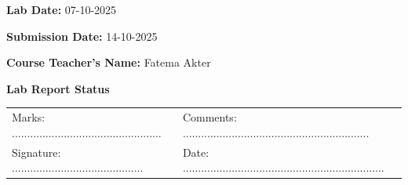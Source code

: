 \documentclass[10pt, a4paper]{scrartcl}
\begin{document}
\begin{titlepage}
\begin{minipage}{0.5\textwidth}
    \end{minipage}
        \vspace{1.5cm}

    
    \begin{flushleft}
        \large
        \textbf{Lab Date:} 07-10-2025\par
        \vspace{0.3cm}
        \textbf{Submission Date:} 14-10-2025\par
        \vspace{0.3cm}
        \textbf{Course Teacher's Name:} Fatema Akter\par
    \end{flushleft}
    
    \vspace{1cm}
    
    \begin{minipage}{\textwidth}
        \centering
        {\large\bfseries Lab Report Status\par}
        \vspace{0.7cm}
        {\renewcommand{\arraystretch}{2}
        \begin{tabular}{|p{} p{}|}
            \hline
            Marks: ................................................. & Comments: ............................................................. \\
            
            Signature: ........................................... & Date: .................................................................. \\
            \hline
        \end{tabular}
        }
    \end{minipage}
    
\end{titlepage}

\end{document}
